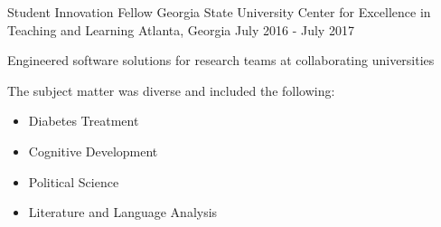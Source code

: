 \begin{cventries}

\cventry
{Student Innovation Fellow} %
{Georgia State University Center for Excellence in Teaching and Learning} %
{Atlanta, Georgia} %
{July 2016 - July 2017} %
{ %
\begin{cvitems}
\item {Engineered software solutions for research teams at collaborating universities}
\item {The subject matter was diverse and included the following:}
\begin{itemize}
\item{Diabetes Treatment}
\item{Cognitive Development}
\item{Political Science}
\item{Literature and Language Analysis}
\end{itemize}
\end{cvitems}
}


\end{cventries}
